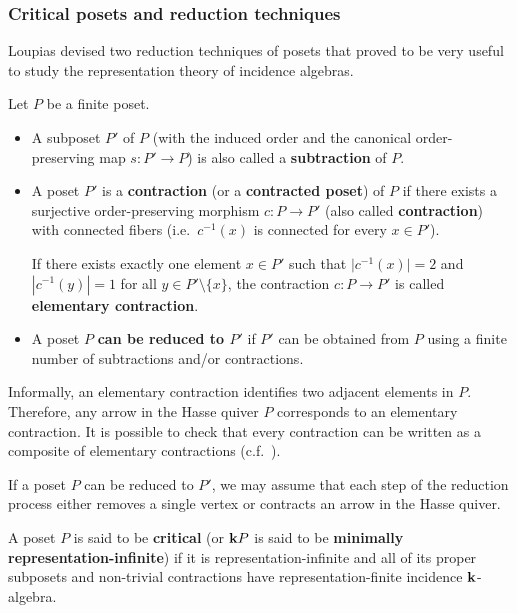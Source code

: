 \subsubsection{Critical posets and reduction techniques}
 
Loupias \cite{lou:ind,lou:repr} devised two reduction techniques of posets that proved to be very useful to study the representation theory of incidence algebras.
\begin{definition}\label{def:reduction}
	Let $P$ be a finite poset.
	\begin{itemize}
		\itemsep0em
		
		\item A subposet $P'$ of $P$ (with the induced order and the canonical order-preserving map $s\colon P'\to P$) is also called a \textbf{subtraction} of $P$.
		
		\item A poset $P'$ is a \textbf{contraction} (or a \textbf{contracted poset}) of $P$ if there exists a surjective order-preserving morphism $c\colon P\rightarrow P'$ (also called \textbf{contraction}) with connected fibers (i.e.~$c^{-1}(x)$ is connected for every $x\in P'$).
		
		\noindent If there exists exactly one element $x\in P'$ such that $\vert c^{-1}(x)\vert=2$ and $|c^{-1}(y)|=1$ for all $y\in P'\setminus \{x\}$, the contraction $c\colon P\to P'$ is called \textbf{elementary contraction}.
		
		\item A poset $P$ \textbf{can be reduced to $P'$} if $P'$ can be obtained from $P$ using a finite number of subtractions and/or contractions.
	\end{itemize}
\end{definition}
Informally, an elementary contraction identifies two adjacent elements in $P$. Therefore, any arrow in the Hasse quiver $P$ corresponds to an elementary contraction. It is possible to check that every contraction can be written as a composite of elementary contractions (c.f.~\cite[Lemma 2.29]{tacchetti2025masterthesis}).

If a poset $P$ can be reduced to $P'$, we may assume that each step of the reduction process either removes a single vertex or contracts an arrow in the Hasse quiver.

\begin{definition}\label{def:criticalposet}
	A poset $P$ is said to be \textbf{critical} (or $\mathbf{k}{P}$ is said to be \textbf{minimally representation-infinite}) if it is representation-infinite and all of its	proper subposets and non-trivial contractions have representation-finite incidence $\mathbf{k}$-algebra.
\end{definition}

